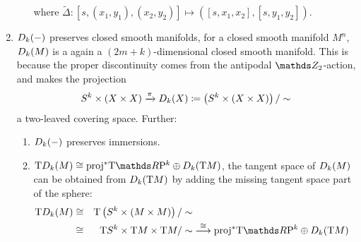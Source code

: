 \begin{Rem}
\begin{enumerate}
\begin{enumerate}
      \begin{center}
      \end{center}
      where
      $\widetilde\Delta\colon
      [s,(x_1,y_1),(x_2,y_2)]\mapsto\left([s,x_1,x_2],[s,y_1,y_2]\right)$.
    \end{enumerate}
  \item\label{item:twistedprodmanifold}
    $D_{k}({-})$ preserves closed smooth manifolds, \idest
    for a closed smooth manifold $M^n$, $D_{k}({M})$ is a
    again a $(2m+k)$-dimensional closed smooth manifold.
    This is because the proper discontinuity comes from the antipodal
    $\Zmod2$-action, and makes the projection
    \begin{gather*}
      S^{k}\times(X\times X)
      \xrightarrow{\pi}
      D_{k}({X})
      \coloneqq
      \left( S^{k}\times(X\times X) \right)/\sim
    \end{gather*}
    a two-leaved covering space.
    Further:
    \begin{enumerate}
    \item\label{item:twistedprodpreservesimmersions}
      $D_{k}({-})$ preserves immersions.
    \item\label{item:twistedprod:tangentspace}
      $\T\Twistedprod{k}{M}
      \cong \pb\proj\T{\RP k} \oplus \Twistedprod{k}{\T M}$,
      \idest the tangent space of $D_{k}({M})$ can be obtained
      from $D_{k}({\mathrm{T}M})$ by adding the missing tangent space
      part of the sphere:
      \begin{alignat*}{4}
        \T{\Twistedprod{k}{M}}
        &\cong& \T{\left(\Twistedprodcovspace{k}{M}\right)}/\sim \\
        &\cong& \T \Sphere k\times \T M\times\T M/\sim
        &\overset{\cong}{\longto}
        \pb\proj \T{\RP k} \oplus \Twistedprod{k}{\T M}

\end{alignat*}
\end{enumerate}
\end{enumerate}
\end{Rem}
